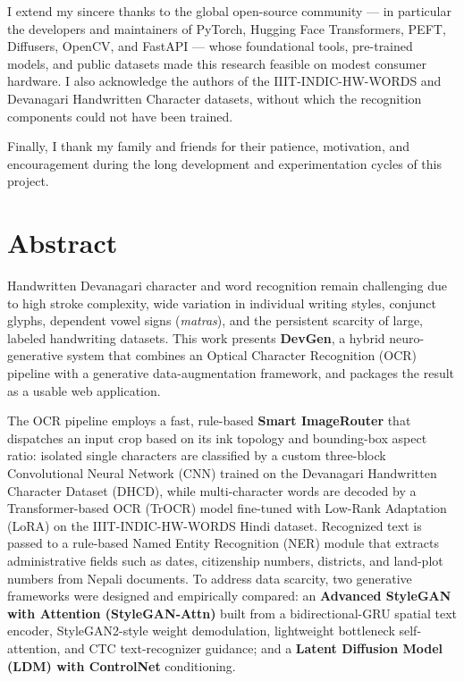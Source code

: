 \documentclass[12pt,a4paper]{report}
\begin{document}
I extend my sincere thanks to the global open-source community --- in particular the developers and maintainers of PyTorch, Hugging Face Transformers, PEFT, Diffusers, OpenCV, and FastAPI --- whose foundational tools, pre-trained models, and public datasets made this research feasible on modest consumer hardware. I also acknowledge the authors of the IIIT-INDIC-HW-WORDS and Devanagari Handwritten Character datasets, without which the recognition components could not have been trained.

Finally, I thank my family and friends for their patience, motivation, and encouragement during the long development and experimentation cycles of this project.

\chapter*{Abstract}

Handwritten Devanagari character and word recognition remain challenging due to high stroke complexity, wide variation in individual writing styles, conjunct glyphs, dependent vowel signs (\textit{matras}), and the persistent scarcity of large, labeled handwriting datasets. This work presents \textbf{DevGen}, a hybrid neuro-generative system that combines an Optical Character Recognition (OCR) pipeline with a generative data-augmentation framework, and packages the result as a usable web application.

The OCR pipeline employs a fast, rule-based \textbf{Smart ImageRouter} that dispatches an input crop based on its ink topology and bounding-box aspect ratio: isolated single characters are classified by a custom three-block Convolutional Neural Network (CNN) trained on the Devanagari Handwritten Character Dataset (DHCD), while multi-character words are decoded by a Transformer-based OCR (TrOCR) model fine-tuned with Low-Rank Adaptation (LoRA) on the IIIT-INDIC-HW-WORDS Hindi dataset. Recognized text is passed to a rule-based Named Entity Recognition (NER) module that extracts administrative fields such as dates, citizenship numbers, districts, and land-plot numbers from Nepali documents. To address data scarcity, two generative frameworks were designed and empirically compared: an \textbf{Advanced StyleGAN with Attention (StyleGAN-Attn)} built from a bidirectional-GRU spatial text encoder, StyleGAN2-style weight demodulation, lightweight bottleneck self-attention, and CTC text-recognizer guidance; and a \textbf{Latent Diffusion Model (LDM) with ControlNet} conditioning.
\end{document}
